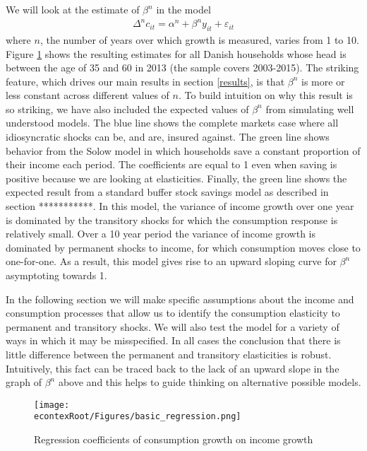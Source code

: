 \documentclass[titlepage]{\econtex}\newcommand{\texname}{IncomeUncertainty}
\begin{document}
We will look at the estimate of $\beta^n$ in the model
\begin{align*}
    \Delta^n c_{it} = \alpha^n + \beta^n y_{it} + \varepsilon_{it}
\end{align*}
where $n$, the number of years over which growth is measured, varies from 1 to 10. Figure \ref{fig:GrowthReg} shows the resulting estimates for all Danish households whose head is between the age of 35 and 60 in 2013 (the sample covers 2003-2015). The striking feature, which drives our main results in section \ref{results}, is that $\beta^n$ is more or less constant across different values of $n$. To build intuition on why this result is so striking, we have also included the expected values of $\beta^n$ from simulating well understood models. The blue line shows the complete markets case where all idiosyncratic shocks can be, and are, insured against. The green line shows behavior from the Solow model in which households save a constant proportion of their income each period. The coefficients are equal to 1 even when saving is positive because we are looking at elasticities. Finally, the green line shows the expected result from a standard buffer stock savings model as described in section ***********. In this model, the variance of income growth over one year is dominated by the transitory shocks for which the consumption response is relatively small. Over a 10 year period the variance of income growth is dominated by permanent shocks to income, for which consumption moves close to one-for-one. As a result, this model gives rise to an upward sloping curve for $\beta^n$ asymptoting towards 1.

In the following section we will make specific assumptions about the income and consumption processes that allow us to identify the consumption elasticity to permanent and transitory shocks. We will also test the model for a variety of ways in which it may be misspecified. In all cases the conclusion that there is little difference between the permanent and transitory elasticities is robust. Intuitively, this fact can be traced back to the lack of an upward slope in the graph of $\beta^n$ above and this helps to guide thinking on alternative possible models.
	\begin{figure} 
	\begin{centering}
	\texttt{[image: \\econtexRoot/Figures/basic\_regression.png]}
	\caption{Regression coefficients of consumption growth on income growth}
	\label{fig:GrowthReg}
	\end{centering}
	\end{figure}
	
\end{document}
